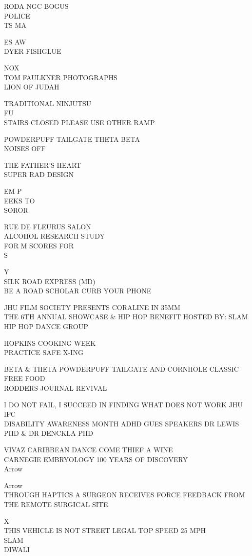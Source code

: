 \documentclass[10pt,letterpaper]{article}
\begin{document}
RODA NGC BOGUS\\
POLICE\\
TS MA

ES AW\\
DYER FISHGLUE

NOX\\
TOM FAULKNER PHOTOGRAPHS\\
LION OF JUDAH

TRADITIONAL NINJUTSU\\
FU\\
STAIRS CLOSED PLEASE USE OTHER RAMP

POWDERPUFF TAILGATE THETA BETA\\
NOISES OFF

THE FATHER'S HEART\\
SUPER RAD DESIGN

EM P\\
EEKS TO\\
SOROR

RUE DE FLEURUS SALON\\
ALCOHOL RESEARCH STUDY\\
FOR M SCORES FOR\\
S

Y\\
SILK ROAD EXPRESS (MD)\\
BE A ROAD SCHOLAR CURB YOUR PHONE

JHU FILM SOCIETY PRESENTS CORALINE IN 35MM\\
THE 6TH ANNUAL SHOWCASE \& HIP HOP BENEFIT HOSTED BY: SLAM HIP HOP DANCE GROUP

HOPKINS COOKING WEEK\\
PRACTICE SAFE X{-}ING

BETA \& THETA POWDERPUFF TAILGATE AND CORNHOLE CLASSIC FREE FOOD\\
RODDERS JOURNAL REVIVAL

I DO NOT FAIL, I SUCCEED IN FINDING WHAT DOES NOT WORK JHU IFC\\
DISABILITY AWARENESS MONTH ADHD GUES SPEAKERS DR LEWIS PHD \& DR DENCKLA PHD

VIVAZ CARIBBEAN DANCE COME THIEF A WINE\\
CARNEGIE EMBRYOLOGY 100 YEARS OF DISCOVERY\\
Arrow

Arrow\\
THROUGH HAPTICS A SURGEON RECEIVES FORCE FEEDBACK FROM THE REMOTE SURGICAL SITE

X\\
THIS VEHICLE IS NOT STREET LEGAL TOP SPEED 25 MPH\\
SLAM\\
DIWALI
\end{document}
